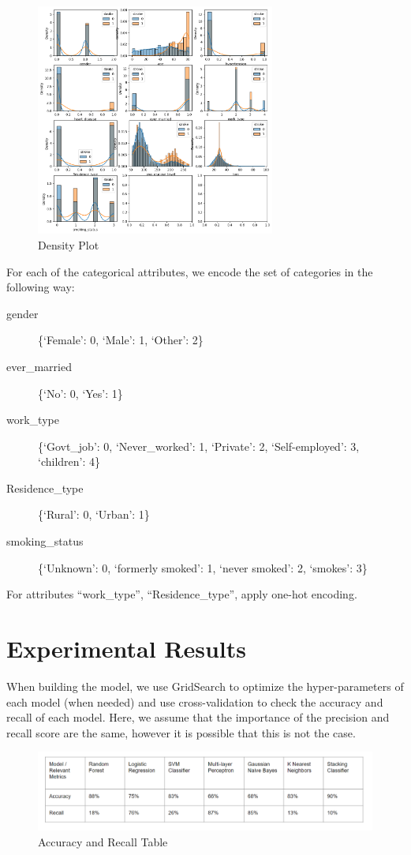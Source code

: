 \documentclass[11pt]{article}
\begin{document}
\begin{figure}[ht]
\centering
\includegraphics[width=0.7\textwidth]{Density.png}
\caption{Density Plot}
\end{figure}

For each of the categorical attributes, we encode the set of categories in the following way:
\begin{description}
    \item[gender] \{`Female': 0, `Male': 1, `Other': 2\}
    \item[ever\_married] \{`No': 0, `Yes': 1\}
    \item[work\_type] \{`Govt\_job': 0, `Never\_worked': 1, `Private': 2, `Self-employed': 3, `children': 4\}
    \item[Residence\_type] \{`Rural': 0, `Urban': 1\}
    \item[smoking\_status] \{`Unknown': 0, `formerly smoked': 1, `never smoked': 2, `smokes': 3\}
\end{description}
For attributes ``work\_type'', ``Residence\_type'', apply one-hot encoding.

\section*{Experimental Results}

When building the model, we use GridSearch to optimize the hyper-parameters of each model (when needed) and use cross-validation to check the accuracy and recall of each model.
Here, we assume that the importance of the precision and recall score are the same, however it is possible that this is not the case.

\begin{figure}[ht]
\centering
\includegraphics[width=1\textwidth]{table.png}
\caption{Accuracy and Recall Table}
\end{figure}
\end{document}
